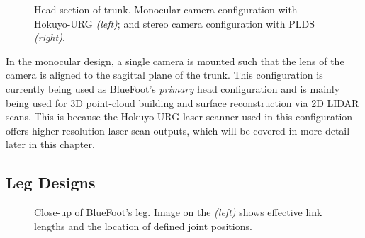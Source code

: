 				\begin{figure}[h!]
					\centering
					\caption{Head section of trunk. Monocular camera configuration with Hokuyo-URG \emph{(left)}; and stereo  camera configuration with PLDS \emph{(right)}. }
					\label{fig::head_module}
				\end{figure}		

				In the monocular design, a single camera is mounted such that the lens of the camera is aligned to the sagittal plane of the trunk. This configuration is currently being used as BlueFoot's \emph{primary} head configuration and is mainly being used for 3D point-cloud building and surface reconstruction via 2D LIDAR scans. This is because the Hokuyo-URG laser scanner used in this configuration offers higher-resolution laser-scan outputs, which will be covered in more detail later in this chapter.

		\subsection{Leg Designs}

			\begin{figure}[h!]
				\centering
				\caption{Close-up of BlueFoot's leg. Image on the \emph{(left)} shows effective link lengths and the location of defined joint positions.}
				\label{fig::leg_labeled}
			\end{figure}
				
